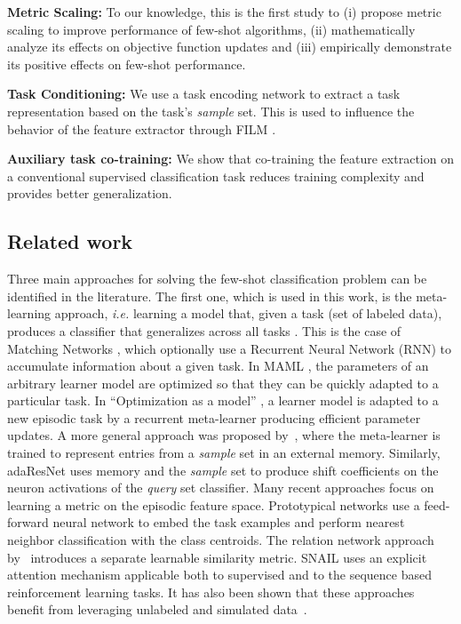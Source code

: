 \documentclass{article}
\begin{document}
\textbf{Metric Scaling:} To our knowledge, this is the first study to (i) propose metric scaling to improve performance of few-shot algorithms, (ii) mathematically analyze its effects on objective function updates and (iii) empirically demonstrate its positive effects on few-shot performance.

\textbf{Task Conditioning:} We use a task encoding network to extract a task representation based on the task's \emph{sample} set. This is used to influence the behavior of the feature extractor through FILM \citep{perez2017film}.

\textbf{Auxiliary task co-training:} We show that co-training the feature extraction on a conventional supervised classification task reduces training complexity and provides better generalization.

\subsection{Related work} \label{ssec:related_work}
Three main approaches for solving the few-shot classification problem can be identified in the literature. The first one, which is used in this work, is the meta-learning approach, \emph{i.e.} learning a model that, given a task (set of labeled data), produces a classifier that generalizes across all tasks \citep{thrun1998lifelong, schmidhuber1997shifting}. This is the case of Matching Networks \citep{vinyals2016matching}, which optionally use a Recurrent Neural Network (RNN) to accumulate information about a given task. In MAML \citep{finn2017model}, the parameters of an arbitrary learner model are optimized so that they can be quickly adapted to a particular task. In ``Optimization as a model'' \citep{ravi2016optimization}, a learner model is adapted to a new episodic task by a recurrent meta-learner producing efficient parameter updates. A more general approach was proposed by~\citet{Santoro16metalearning}, where the meta-learner is trained to represent entries from a \emph{sample} set in an external memory. Similarly, adaResNet \citep{munkhdalai2018rapid} uses memory and the \emph{sample} set to produce shift coefficients on the neuron activations of the \emph{query} set classifier.
Many recent approaches focus on learning a metric on the episodic feature space. Prototypical networks \citep{snell2017prototypical} use a feed-forward neural network to embed the task examples and perform nearest neighbor classification with the class centroids. The relation network approach by~\citet{sung2018learning} introduces a separate learnable similarity metric. SNAIL \citep{mishra2018simle} uses an explicit attention mechanism applicable both to supervised and to the sequence based reinforcement learning tasks. It has also been shown that these approaches benefit from leveraging unlabeled and simulated data~\citep{ren2018meta, yuxiongwang2017imaginary}.
\end{document}
